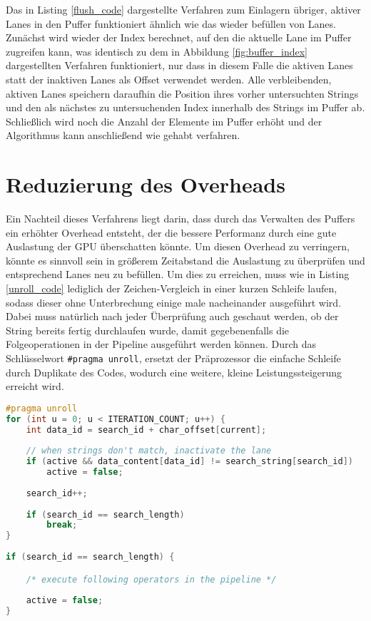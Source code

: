 Das in Listing \ref{flush_code} dargestellte Verfahren zum Einlagern übriger, aktiver Lanes in den Puffer funktioniert ähnlich wie das wieder befüllen von Lanes.
Zunächst wird wieder der Index berechnet, auf den die aktuelle Lane im Puffer zugreifen kann, was identisch zu dem in Abbildung \ref{fig:buffer_index} dargestellten Verfahren funktioniert, nur dass in diesem Falle die aktiven Lanes statt der inaktiven Lanes als Offset verwendet werden.
Alle verbleibenden, aktiven Lanes speichern daraufhin die Position ihres vorher untersuchten Strings und den als nächstes zu untersuchenden Index innerhalb des Strings im Puffer ab.
Schließlich wird noch die Anzahl der Elemente im Puffer erhöht und der Algorithmus kann anschließend wie gehabt verfahren.

\section{Reduzierung des Overheads}

Ein Nachteil dieses Verfahrens liegt darin, dass durch das Verwalten des Puffers ein erhöhter Overhead entsteht, der die bessere Performanz durch eine gute Auslastung der GPU überschatten könnte.
Um diesen Overhead zu verringern, könnte es sinnvoll sein in größerem Zeitabstand die Auslastung zu überprüfen und entsprechend Lanes neu zu befüllen.
Um dies zu erreichen, muss wie in Listing \ref{unroll_code} lediglich der Zeichen-Vergleich in einer kurzen Schleife laufen, sodass dieser ohne Unterbrechung einige male nacheinander ausgeführt wird.
Dabei muss natürlich nach jeder Überprüfung auch geschaut werden, ob der String bereits fertig durchlaufen wurde, damit gegebenenfalls die Folgeoperationen in der Pipeline ausgeführt werden können.
Durch das Schlüsselwort \texttt{\#pragma unroll}, ersetzt der Präprozessor die einfache Schleife durch Duplikate des Codes, wodurch eine weitere, kleine Leistungssteigerung erreicht wird.

\begin{lstlisting}[language=C++,
caption={Reduzierung des Overheads des Verfahrens},
label=unroll_code]
#pragma unroll
for (int u = 0; u < ITERATION_COUNT; u++) {
	int data_id = search_id + char_offset[current];
	
	// when strings don't match, inactivate the lane
	if (active && data_content[data_id] != search_string[search_id])
		active = false;
	
	search_id++;
	
	if (search_id == search_length)
		break;
}
	
if (search_id == search_length) {

	/* execute following operators in the pipeline */
	
	active = false;
}
\end{lstlisting}

